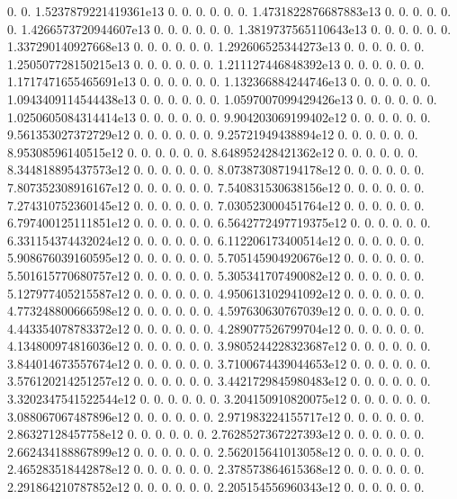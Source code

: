 0. 0. 1.\+5237879221419361e13 0. 0. 0. 0. 0. 0. 1.\+4731822876687883e13 0. 0. 0. 0. 0. 0. 1.\+4266573720944607e13 0. 0. 0. 0. 0. 0. 1.\+3819737565110643e13 0. 0. 0. 0. 0. 0. 1.\+337290140927668e13 0. 0. 0. 0. 0. 0. 1.\+292606525344273e13 0. 0. 0. 0. 0. 0. 1.\+250507728150215e13 0. 0. 0. 0. 0. 0. 1.\+211127446848392e13 0. 0. 0. 0. 0. 0. 1.\+1717471655465691e13 0. 0. 0. 0. 0. 0. 1.\+132366884244746e13 0. 0. 0. 0. 0. 0. 1.\+0943409114544438e13 0. 0. 0. 0. 0. 0. 1.\+0597007099429426e13 0. 0. 0. 0. 0. 0. 1.\+0250605084314414e13 0. 0. 0. 0. 0. 0. 9.\+904203069199402e12 0. 0. 0. 0. 0. 0. 9.\+561353027372729e12 0. 0. 0. 0. 0. 0. 9.\+25721949438894e12 0. 0. 0. 0. 0. 0. 8.\+95308596140515e12 0. 0. 0. 0. 0. 0. 8.\+648952428421362e12 0. 0. 0. 0. 0. 0. 8.\+344818895437573e12 0. 0. 0. 0. 0. 0. 8.\+073873087194178e12 0. 0. 0. 0. 0. 0. 7.\+807352308916167e12 0. 0. 0. 0. 0. 0. 7.\+540831530638156e12 0. 0. 0. 0. 0. 0. 7.\+274310752360145e12 0. 0. 0. 0. 0. 0. 7.\+030523000451764e12 0. 0. 0. 0. 0. 0. 6.\+797400125111851e12 0. 0. 0. 0. 0. 0. 6.\+5642772497719375e12 0. 0. 0. 0. 0. 0. 6.\+331154374432024e12 0. 0. 0. 0. 0. 0. 6.\+112206173400514e12 0. 0. 0. 0. 0. 0. 5.\+908676039160595e12 0. 0. 0. 0. 0. 0. 5.\+705145904920676e12 0. 0. 0. 0. 0. 0. 5.\+501615770680757e12 0. 0. 0. 0. 0. 0. 5.\+305341707490082e12 0. 0. 0. 0. 0. 0. 5.\+127977405215587e12 0. 0. 0. 0. 0. 0. 4.\+950613102941092e12 0. 0. 0. 0. 0. 0. 4.\+773248800666598e12 0. 0. 0. 0. 0. 0. 4.\+597630630767039e12 0. 0. 0. 0. 0. 0. 4.\+443354078783372e12 0. 0. 0. 0. 0. 0. 4.\+289077526799704e12 0. 0. 0. 0. 0. 0. 4.\+134800974816036e12 0. 0. 0. 0. 0. 0. 3.\+9805244228323687e12 0. 0. 0. 0. 0. 0. 3.\+844014673557674e12 0. 0. 0. 0. 0. 0. 3.\+7100674439044653e12 0. 0. 0. 0. 0. 0. 3.\+576120214251257e12 0. 0. 0. 0. 0. 0. 3.\+4421729845980483e12 0. 0. 0. 0. 0. 0. 3.\+3202347541522544e12 0. 0. 0. 0. 0. 0. 3.\+204150910820075e12 0. 0. 0. 0. 0. 0. 3.\+088067067487896e12 0. 0. 0. 0. 0. 0. 2.\+971983224155717e12 0. 0. 0. 0. 0. 0. 2.\+86327128457758e12 0. 0. 0. 0. 0. 0. 2.\+7628527367227393e12 0. 0. 0. 0. 0. 0. 2.\+662434188867899e12 0. 0. 0. 0. 0. 0. 2.\+562015641013058e12 0. 0. 0. 0. 0. 0. 2.\+465283518442878e12 0. 0. 0. 0. 0. 0. 2.\+378573864615368e12 0. 0. 0. 0. 0. 0. 2.\+291864210787852e12 0. 0. 0. 0. 0. 0. 2.\+205154556960343e12 0. 0. 0. 0. 0. 0. 
